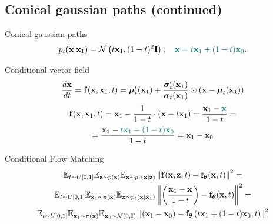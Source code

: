 \subsection{Conical gaussian paths (continued)}
\begin{frame}{Conical gaussian paths}
	\vspace{-0.3cm}
	\[
		p_t(\mathbf{x} | \mathbf{x}_1) = \mathcal{N}\left(t \mathbf{x}_1, (1-t)^2 \mathbf{I}\right); \quad {\color{teal}\mathbf{x}= t \mathbf{x}_1 + (1 - t) \mathbf{x}_0}. 
	\]
	\vspace{-0.5cm}
	\begin{block}{Conditional vector field}
		\vspace{-0.3cm}
		\[
			 \frac{d\mathbf{x}}{dt} = \mathbf{f}(\mathbf{x}, \mathbf{x}_1, t) =  \boldsymbol{\mu}_t'(\mathbf{x}_1) + \frac{\boldsymbol{\sigma}_t'(\mathbf{x}_1)}{\boldsymbol{\sigma}_t(\mathbf{x}_1)} \odot (\mathbf{x} - \boldsymbol{\mu}_t(\mathbf{x}_1))
		\]
		\vspace{-0.5cm}
		\begin{multline*}
			\mathbf{f}(\mathbf{x}, \mathbf{x}_1, t) = \mathbf{x}_1 - \frac{1}{1-t} \cdot (\mathbf{x} - t \mathbf{x}_1) = \frac{\mathbf{x}_1 - {\color{teal}\mathbf{x}}}{1-t} = \\
			= \frac{\mathbf{x}_1 - {\color{teal}t \mathbf{x}_1 - (1 - t) \mathbf{x}_0}}{1-t} = \mathbf{x}_1 - \mathbf{x}_0
		\end{multline*}
		\vspace{-0.7cm}
	\end{block}
	\begin{block}{Conditional Flow Matching}
		\vspace{-0.7cm}
		\begin{multline*}
			\mathbb{E}_{t \sim U[0, 1]} \mathbb{E}_{\mathbf{z} \sim p(\mathbf{z})} \mathbb{E}_{\mathbf{x} \sim p_t(\mathbf{x} | \mathbf{z})}\left\| \mathbf{f}(\mathbf{x}, \mathbf{z}, t) - \mathbf{f}_{\boldsymbol{\theta}}(\mathbf{x}, t) \right\|^2 = \\
		 \mathbb{E}_{t \sim U[0, 1]} \mathbb{E}_{\mathbf{x}_1 \sim \pi(\mathbf{x})} \mathbb{E}_{\mathbf{x} \sim p_t(\mathbf{x} | \mathbf{x}_1)}\left\| \left(\frac{\mathbf{x}_1 - \mathbf{x}}{1-t}\right) - \mathbf{f}_{\boldsymbol{\theta}}(\mathbf{x}, t) \right\|^2 = \\
		 \mathbb{E}_{t \sim U[0, 1]} \mathbb{E}_{\mathbf{x}_1 \sim \pi(\mathbf{x})} \mathbb{E}_{\mathbf{x}_0 \sim \mathcal{N}(0, \mathbf{I})}\left\| (\mathbf{x}_1 - \mathbf{x}_0) - \mathbf{f}_{\boldsymbol{\theta}}\left(t \mathbf{x}_1 + (1 - t) \mathbf{x}_0, t\right) \right\|^2
		\end{multline*}
		\vspace{-0.5cm}
	\end{block}	
\end{frame}
